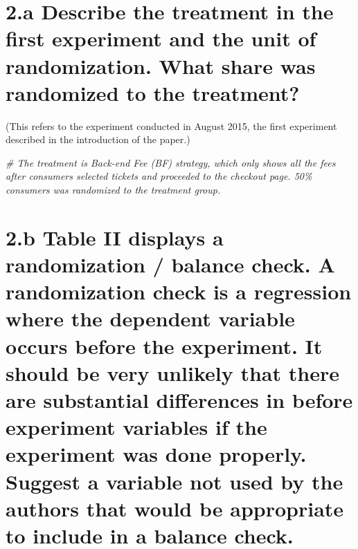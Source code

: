 \documentclass[
]{article}
\newenvironment{Shaded}{\begin{snugshade}}{\end{snugshade}}
\newcommand{\CommentTok}[1]{\textcolor[rgb]{0.56,0.35,0.01}{\textit{#1}}}
\begin{document}
\hypertarget{a-describe-the-treatment-in-the-first-experiment-and-the-unit-of-randomization.-what-share-was-randomized-to-the-treatment}{%
\section{2.a Describe the treatment in the first experiment and the unit
of randomization. What share was randomized to the
treatment?}\label{a-describe-the-treatment-in-the-first-experiment-and-the-unit-of-randomization.-what-share-was-randomized-to-the-treatment}}

(This refers to the experiment conducted in August 2015, the first
experiment described in the introduction of the paper.)

\begin{Shaded}
\begin{Highlighting}[]
\CommentTok{\# The treatment is Back{-}end Fee (BF) strategy, which only shows all the fees after consumers selected tickets and proceeded to the checkout page. 50\% consumers was randomized to the treatment group.}
\end{Highlighting}
\end{Shaded}

\hypertarget{b-table-ii-displays-a-randomization-balance-check.-a-randomization-check-is-a-regression-where-the-dependent-variable-occurs-before-the-experiment.-it-should-be-very-unlikely-that-there-are-substantial-differences-in-before-experiment-variables-if-the-experiment-was-done-properly.-suggest-a-variable-not-used-by-the-authors-that-would-be-appropriate-to-include-in-a-balance-check.}{%
\section{2.b Table II displays a randomization / balance check. A
randomization check is a regression where the dependent variable occurs
before the experiment. It should be very unlikely that there are
substantial differences in before experiment variables if the experiment
was done properly. Suggest a variable not used by the authors that would
be appropriate to include in a balance
check.}\label{b-table-ii-displays-a-randomization-balance-check.-a-randomization-check-is-a-regression-where-the-dependent-variable-occurs-before-the-experiment.-it-should-be-very-unlikely-that-there-are-substantial-differences-in-before-experiment-variables-if-the-experiment-was-done-properly.-suggest-a-variable-not-used-by-the-authors-that-would-be-appropriate-to-include-in-a-balance-check.}}
\end{document}
